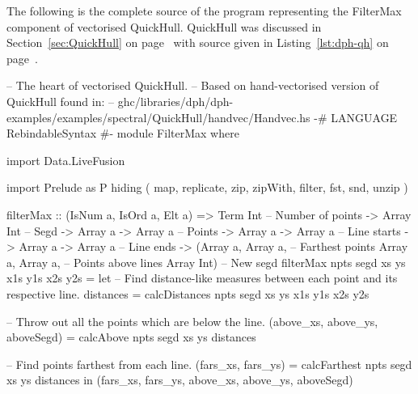 \documentclass[preamble.tex]{subfiles}
\begin{document}
The following is the complete source of the program representing the FilterMax component of vectorised QuickHull. QuickHull was discussed in Section~\ref{sec:QuickHull} on page~\pageref{sec:QuickHull} with  source given in Listing~\ref{lst:dph-qh} on page~\pageref{lst:dph-qh}.


\begin{hscode}
-- The heart of vectorised QuickHull.
-- Based on hand-vectorised version of QuickHull found in:
-- ghc/libraries/dph/dph-examples/examples/spectral/QuickHull/handvec/Handvec.hs
{-# LANGUAGE RebindableSyntax #-}
module FilterMax where

import Data.LiveFusion

import Prelude as P hiding ( map, replicate, zip, zipWith,
                             filter, fst, snd, unzip )

filterMax :: (IsNum a, IsOrd a, Elt a)
          => Term Int            -- Number of points
          -> Array Int           -- Segd
          -> Array a -> Array a  -- Points
          -> Array a -> Array a  -- Line starts
          -> Array a -> Array a  -- Line ends
          -> (Array a, Array a,  -- Farthest points
              Array a, Array a,  -- Points above lines
              Array Int)         -- New segd
filterMax npts segd xs ys x1s y1s x2s y2s
  = let -- Find distance-like measures between each point and its respective line.
        distances = calcDistances npts segd xs ys x1s y1s x2s y2s

        -- Throw out all the points which are below the line.
        (above_xs, above_ys, aboveSegd) = calcAbove npts segd xs ys distances

        -- Find points farthest from each line.
        (fars_xs, fars_ys) = calcFarthest npts segd xs ys distances
    in  (fars_xs, fars_ys, above_xs, above_ys, aboveSegd)


\end{hscode}
\end{document}
